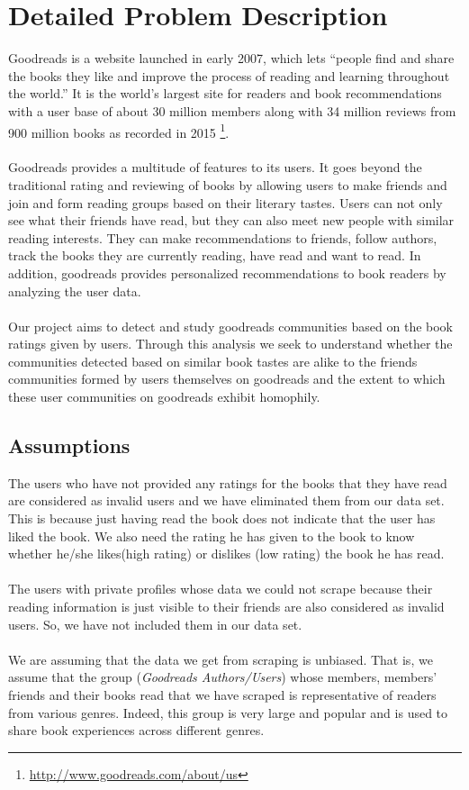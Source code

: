 \documentclass[11pt]{article}
\begin{document}
\maketitle

\section{Detailed Problem Description}
Goodreads is a website launched in early 2007, which lets ``people find and share the books they like and improve the process of reading and learning throughout the world.'' It is the world's largest site for readers and book recommendations with a user base of about 30 million members along with 34 million reviews from 900 million books as recorded in 2015 \footnote{\url{http://www.goodreads.com/about/us}}.\\\\
Goodreads provides a multitude of features to its users. It goes beyond the traditional rating and reviewing of books by allowing users to make friends and join and form reading groups based on their literary tastes.
Users can not only see what their friends have read, but they can also meet new people with similar reading interests. They can make recommendations to friends, follow authors, track the books they are currently reading, have read and want to read. In addition, goodreads provides personalized recommendations to book readers by analyzing the user data.\\\\
Our project aims  to detect and study goodreads communities based on the book ratings given by users. Through this analysis we seek to understand whether the communities detected based on similar book tastes are alike to the friends communities formed by users themselves on goodreads and the extent to which these user communities on goodreads exhibit homophily.
\subsection{Assumptions}

The users who have not provided any ratings for the books that they have read are considered as invalid users and we have eliminated them from our data set. This is because just having read the book does not indicate that the user has liked the book. We also need the rating he has given to the book to know whether he/she likes(high rating) or dislikes (low rating) the book he has read.\\\\
The users with private profiles whose data we could not scrape because their reading information is just visible to their friends are also considered as invalid users. So, we have not included them in our data set.\\\\
We are assuming that the data we get from scraping is unbiased. That is, we assume that the group ({\it Goodreads Authors/Users}) whose members, members' friends and their books read that we have scraped is representative of readers from various genres. Indeed, this group is very large and popular and is used to share book experiences across different genres.
\end{document}
